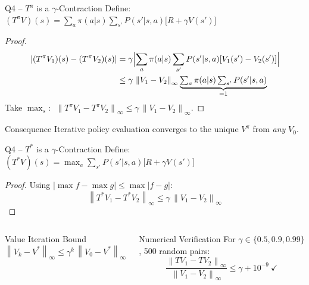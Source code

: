 \documentclass[aspectratio=169,12pt]{beamer}
\newcommand{\Vstar}{V^{*}}
\newcommand{\norm}[1]{\left\|#1\right\|_{\infty}}
\newcommand{\Tpi}{T^{\pi}}
\newcommand{\Tstar}{T^{*}}
\begin{document}
\begin{frame}{Q4 -- $\Tpi$ is a $\gamma$-Contraction}
  Define: $(\Tpi V)(s) = \sum_a\pi(a|s)\sum_{s'}P(s'|s,a)\bigl[R+\gamma V(s')\bigr]$

  \begin{proof}
    \vspace{-4pt}
    \begin{align*}
      |(\Tpi V_1)(s) - (\Tpi V_2)(s)|
      &= \gamma\Bigl|\sum_a\pi(a|s)\sum_{s'}P(s'|s,a)[V_1(s')-V_2(s')]\Bigr|\\
      &\leq \gamma\,\norm{V_1-V_2}\underbrace{\textstyle\sum_a\pi(a|s)\sum_{s'}P(s'|s,a)}_{=1}
    \end{align*}
    Take $\max_s$: $\;\norm{\Tpi V_1-\Tpi V_2}\leq\gamma\,\norm{V_1-V_2}.$
  \end{proof}

  \begin{alertblock}{Consequence}
    Iterative policy evaluation converges to the unique $V^\pi$ from \emph{any} $V_0$.
  \end{alertblock}
\end{frame}

\begin{frame}{Q4 -- $\Tstar$ is a $\gamma$-Contraction}
  Define: $(\Tstar V)(s) = \max_a\sum_{s'}P(s'|s,a)\bigl[R+\gamma V(s')\bigr]$

  \begin{proof}
    Using $|\max f - \max g|\leq\max|f-g|$:
    \[
      \norm{\Tstar V_1-\Tstar V_2}\leq\gamma\,\norm{V_1-V_2}
    \]
  \end{proof}

  \begin{columns}[T]
    \begin{block}{Value Iteration Bound}
      \[
        \norm{V_k-\Vstar}\leq\gamma^k\,\norm{V_0-\Vstar}
      \]
    \end{block}

    \begin{block}{Numerical Verification}
      \scriptsize
      For $\gamma\in\{0.5,0.9,0.99\}$, 500 random pairs:
      \[
        \frac{\norm{TV_1-TV_2}}{\norm{V_1-V_2}}\leq\gamma+10^{-9}\ \checkmark
      \]
    \end{block}
  \end{columns}
\end{frame}
\end{document}
